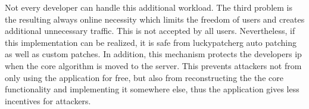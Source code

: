Not every developer can handle this additional workload.
\newline
The third problem is the resulting always online necessity which limits the freedom of users and creates additional unnecessary traffic.
This is not accepted by all users.
\newline
\newline
Nevertheless, if this implementation can be realized, it is safe from \gls{luckypatcherg} auto patching as well as custom patches.
In addition, this mechanism protects the developers \gls{ip} when the core algorithm is moved to the server.
This prevents attackers not from only using the application for free, but also from reconstructing the the core functionality and implementing it somewhere else, thus the application gives less incentives for attackers.
